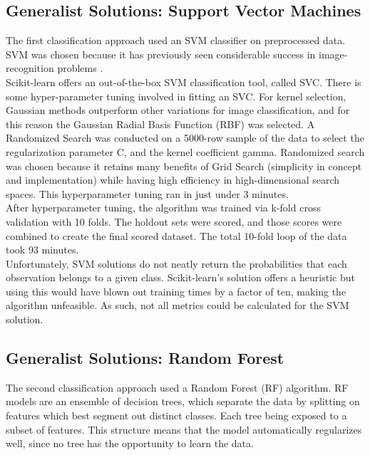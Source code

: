 \documentclass[12pt]{article}
\begin{document}
\subsection{Generalist Solutions: Support Vector Machines}
The first classification approach used an SVM classifier on preprocessed data. SVM was chosen because it has previously seen considerable success in image-recognition problems \citep{svmkernels}.\\

Scikit-learn offers an out-of-the-box SVM classification tool, called SVC. There is some hyper-parameter tuning involved in fitting an SVC. For kernel selection, Gaussian methods outperform other variations for image classification\citep{svmkernels}, and for this reason the Gaussian Radial Basis Function (RBF) was selected. A Randomized Search was conducted on a 5000-row sample of the data to select the regularization parameter C, and the kernel coefficient gamma. Randomized search was chosen because it retains many benefits of Grid Search (simplicity in concept and implementation) while having high efficiency in high-dimensional search spaces. This hyperparameter tuning ran in just under 3 minutes.\\

After hyperparameter tuning, the algorithm was trained via k-fold cross validation with 10 folds. The holdout sets were scored, and those scores were combined to create the final scored dataset. The total 10-fold loop of the data took 93 minutes.\\

Unfortunately, SVM solutions do not neatly return the probabilities that each observation belongs to a given class. Scikit-learn's solution offers a heuristic but using this would have blown out training times by a factor of ten, making the algorithm unfeasible. As such, not all metrics could be calculated for the SVM solution.\\


\subsection{Generalist Solutions: Random Forest}
The second classification approach used a Random Forest (RF) algorithm. RF models are an ensemble of decision trees, which separate the data by splitting on features which best segment out distinct classes. Each tree being exposed to a subset of features. This structure means that the model automatically regularizes well, since no tree has the opportunity to learn the data. \\
\end{document}
